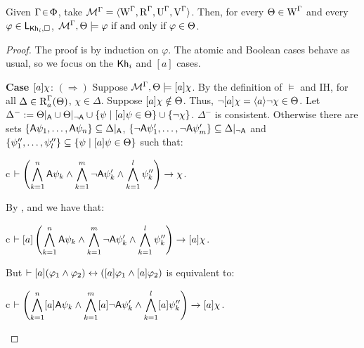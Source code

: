 \begin{lemma}\label{tlm:cm-ults-lkhi}
Given $\Gamma \!\in\! \Upphi$, take $\mathcal{M}^\Gamma = \langle \operatorname{W}^\Gamma, \operatorname{R}^\Gamma, \operatorname{U}^\Gamma, \operatorname{V}^\Gamma \rangle$. Then, for every $\Theta \in \operatorname{W}^\Gamma$ and every $\varphi \in \mathsf{L}_{{\sf Kh}_i,\square}$,  %
$\mathcal{M}^\Gamma, \Theta \models \varphi \mbox{ if and only if } \varphi \in \Theta$.
\end{lemma}
\begin{proof}
The proof is by induction on $\varphi$.
The atomic and Boolean cases behave as usual, so we focus on the ${\sf Kh}_i$ and $[a]$ cases.
\medskip

\noindent
\textbf{Case $[a]\chi$}: $(\Rightarrow)$ Suppose $\mathcal{M}^\Gamma,\Theta \models [a]\chi$. By the definition of $\models$ and IH, for all $\Delta \in \operatorname{R}^\Gamma_a(\Theta)$, $\chi \in \Delta$.
Suppose $[a]\chi \notin \Theta$. Thus, $\neg[a]\chi = \langle a \rangle\neg\chi \in \Theta$.
Let $\Delta^- := \Theta\vert_{{\sf A}} \cup \Theta\vert_{\lnot{\sf A}} \cup \{ \psi \mid [a]\psi \in \Theta \} \cup \{ \neg\chi \}$. $\Delta^-$ is consistent.
Otherwise there are sets $\{ {\sf A}\psi_1, \ldots, {\sf A}\psi_n \} \subseteq \Delta\vert_{{\sf A}}$, $\{ \lnot {\sf A}\psi'_1, \ldots, \lnot {\sf A}\psi'_m \} \subseteq \Delta\vert_{\lnot{\sf A}}$ and $\{ \psi''_1, \ldots, \psi''_l \} \subseteq \{ \psi \mid [a]\psi \in \Theta \}$ such that:

\begin{ctabular}{c}
$\vdash
\displaystyle
\left( \bigwedge_{k=1}^{n} {\sf A}\psi_k \land \bigwedge_{k=1}^{m} \lnot {\sf A}\psi'_k \land \bigwedge_{k=1}^{l} \psi''_k \right)
\rightarrow \chi$.
\end{ctabular}

By ,  and  we have that:

\begin{ctabular}{c}
$\vdash
\displaystyle
[a] \left( \bigwedge_{k=1}^{n} {\sf A}\psi_k \land \bigwedge_{k=1}^{m} \lnot {\sf A}\psi'_k \land \bigwedge_{k=1}^{l} \psi''_k \right)
\rightarrow [a] \chi$.
\end{ctabular}

But $\vdash [a](\varphi_1 \wedge \varphi_2) \leftrightarrow ([a] \varphi_1 \wedge [a] \varphi_2)$ is equivalent to:

\begin{ctabular}{c}
$\vdash
\displaystyle
\left( \bigwedge_{k=1}^{n} [a]{\sf A}\psi_k \land \bigwedge_{k=1}^{m} [a]\lnot {\sf A}\psi'_k \land \bigwedge_{k=1}^{l} [a]\psi''_k \right)
\rightarrow [a] \chi$.
\end{ctabular}


\end{proof}
